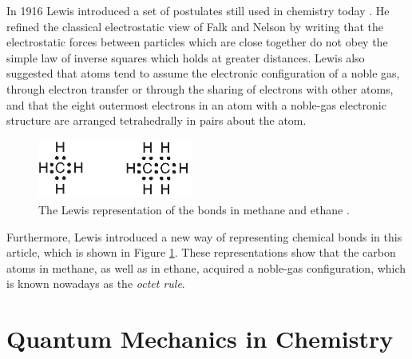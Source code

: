 In 1916 Lewis introduced a set of postulates still used in chemistry today \cite{lewis}. He refined the classical electrostatic view of Falk and Nelson by writing that the electrostatic forces between particles which are close together do not obey the simple law of inverse squares which holds at greater distances. Lewis also suggested that atoms tend to assume the electronic configuration of a noble gas, through electron transfer or through the sharing of electrons with other atoms, and that the eight outermost electrons in an atom with a noble-gas electronic structure are arranged tetrahedrally in pairs about the atom.
\begin{figure}[htdp]
\center
\includegraphics[width=2in]{introduction/figures/figure2.eps}
\caption{The Lewis representation of the bonds in methane and ethane \cite{lewis}.}
\label{ch1.fig2}
\end{figure}
Furthermore, Lewis introduced a new way of representing chemical bonds in this article, which is shown in Figure \ref{ch1.fig2}. These representations show that the carbon atoms in methane, as well as in ethane, acquired a noble-gas configuration, which is known nowadays as the \textit{octet rule}.

\section{Quantum Mechanics in Chemistry}

